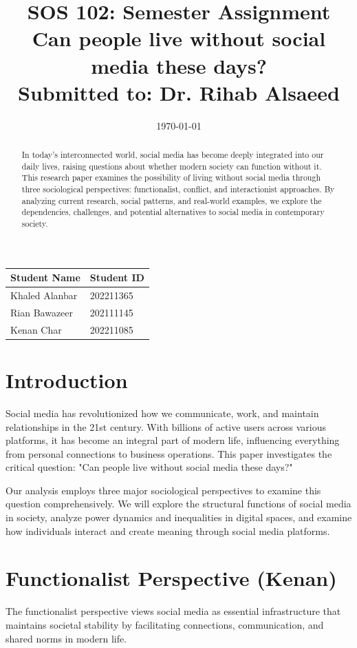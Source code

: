 \documentclass{article}
\title{SOS 102: Semester Assignment\\
\large Can people live without social media these days?\\
\vspace{0.5cm}
\normalsize Submitted to: Dr. Rihab Alsaeed}
\date{\today}
\begin{document}
\maketitle

\vspace{1cm}
\begin{center}
\begin{tabular}{|p{5cm}|p{5cm}|}
\hline
\textbf{Student Name} & \textbf{Student ID} \\
\hline
Khaled Alanbar & 202211365 \\
\hline
Rian Bawazeer & 202111145 \\
\hline
Kenan Char  & 202211085 \\
\hline
\end{tabular}
\end{center}
\newpage

\begin{abstract}
\noindent
In today's interconnected world, social media has become deeply integrated into our daily lives, raising questions about whether modern society can function without it. This research paper examines the possibility of living without social media through three sociological perspectives: functionalist, conflict, and interactionist approaches. By analyzing current research, social patterns, and real-world examples, we explore the dependencies, challenges, and potential alternatives to social media in contemporary society.
\end{abstract}
\newpage

\section{Introduction}
\indent Social media has revolutionized how we communicate, work, and maintain relationships in the 21st century. With billions of active users across various platforms, it has become an integral part of modern life, influencing everything from personal connections to business operations. This paper investigates the critical question: "Can people live without social media these days?"

Our analysis employs three major sociological perspectives to examine this question comprehensively. We will explore the structural functions of social media in society, analyze power dynamics and inequalities in digital spaces, and examine how individuals interact and create meaning through social media platforms.

\section{Functionalist Perspective (Kenan)}
The functionalist perspective views social media as essential infrastructure that maintains societal stability by facilitating connections, communication, and shared norms in modern life.
\end{document}
